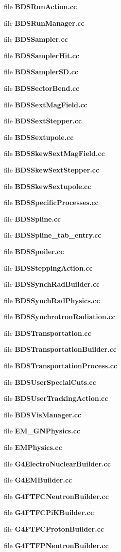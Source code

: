 \begin{CompactItemize}
file {\bf BDSRunAction.cc}
\item 
file {\bf BDSRunManager.cc}
\item 
file {\bf BDSSampler.cc}
\item 
file {\bf BDSSamplerHit.cc}
\item 
file {\bf BDSSamplerSD.cc}
\item 
file {\bf BDSSectorBend.cc}
\item 
file {\bf BDSSextMagField.cc}
\item 
file {\bf BDSSextStepper.cc}
\item 
file {\bf BDSSextupole.cc}
\item 
file {\bf BDSSkewSextMagField.cc}
\item 
file {\bf BDSSkewSextStepper.cc}
\item 
file {\bf BDSSkewSextupole.cc}
\item 
file {\bf BDSSpecificProcesses.cc}
\item 
file {\bf BDSSpline.cc}
\item 
file {\bf BDSSpline_tab_entry.cc}
\item 
file {\bf BDSSpoiler.cc}
\item 
file {\bf BDSSteppingAction.cc}
\item 
file {\bf BDSSynchRadBuilder.cc}
\item 
file {\bf BDSSynchRadPhysics.cc}
\item 
file {\bf BDSSynchrotronRadiation.cc}
\item 
file {\bf BDSTransportation.cc}
\item 
file {\bf BDSTransportationBuilder.cc}
\item 
file {\bf BDSTransportationProcess.cc}
\item 
file {\bf BDSUserSpecialCuts.cc}
\item 
file {\bf BDSUserTrackingAction.cc}
\item 
file {\bf BDSVisManager.cc}
\item 
file {\bf EM_GNPhysics.cc}
\item 
file {\bf EMPhysics.cc}
\item 
file {\bf G4ElectroNuclearBuilder.cc}
\item 
file {\bf G4EMBuilder.cc}
\item 
file {\bf G4FTFCNeutronBuilder.cc}
\item 
file {\bf G4FTFCPiKBuilder.cc}
\item 
file {\bf G4FTFCProtonBuilder.cc}
\item 
file {\bf G4FTFPNeutronBuilder.cc}

\end{CompactItemize}
